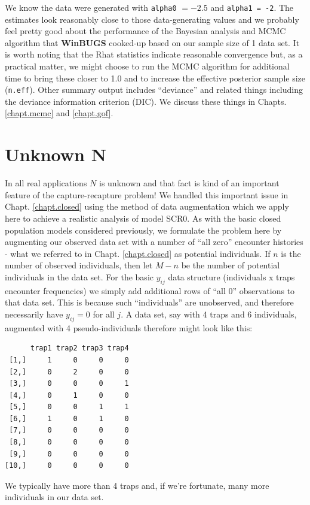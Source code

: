 We know the data were generated with \mbox{\tt alpha0} $= -2.5$ and
\mbox{\tt alpha1 = -2}. The estimates look reasonably close to those
data-generating values and we probably feel pretty good about the
performance of the Bayesian analysis and MCMC algorithm that {\bf WinBUGS}
cooked-up based on our sample size of 1 data set.  It is worth noting
that the Rhat statistics indicate reasonable convergence but, as a
practical matter, we might choose to run the MCMC algorithm for
additional time to bring these closer to 1.0 and to increase the
effective posterior sample size (\mbox{\tt n.eff}). Other summary output includes
``deviance'' and related things including the deviance information
criterion (DIC). We discuss these things in Chapts. \ref{chapt.mcmc}
and \ref{chapt.gof}.



\section{Unknown N}
\label{scr0.sec.unknownN}

In all real applications $N$ is unknown and that fact is kind of an
important feature of the capture-recapture problem!  We handled this
important issue in Chapt. \ref{chapt.closed} using the method of data augmentation
which we apply here to achieve a realistic analysis of model SCR0. As
with the basic closed population models considered previously, we
formulate the problem here by augmenting our observed data set with a
number of ``all zero'' encounter histories - what we referred to in
Chapt. \ref{chapt.closed} as potential individuals. If $n$ is the number of observed
individuals, then let $M-n$ be the number of potential individuals in
the data set. For the basic $y_{ij}$ data structure (individuals x
traps encounter frequencies) we simply add additional rows of ``all
0'' observations to that data set. This is because such
``individuals'' are unobserved, and therefore necessarily have
$y_{ij}=0$ for all $j$.  A data set, say with 4 traps and 6 individuals,
augmented with 4 pseudo-individuals therefore might look like this:
{\small
\begin{verbatim}
      trap1 trap2 trap3 trap4
 [1,]     1     0     0     0
 [2,]     0     2     0     0
 [3,]     0     0     0     1
 [4,]     0     1     0     0
 [5,]     0     0     1     1
 [6,]     1     0     1     0
 [7,]     0     0     0     0
 [8,]     0     0     0     0
 [9,]     0     0     0     0
[10,]     0     0     0     0
\end{verbatim}
}
We typically have more than 4 traps and, if we're fortunate, many more
individuals in our data set.

